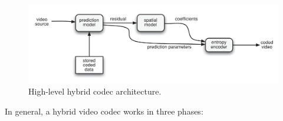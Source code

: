 \begin{figure}[h]
	\centering
	
	\includegraphics[width=\textwidth]{res/hybrid_codec_high_level.png}
	
	\caption{High-level hybrid codec architecture.\cite{h264}}
	\label{fig:codec_highlevel}
\end{figure}

In general, a hybrid video codec works in three phases:\cite{h264}

